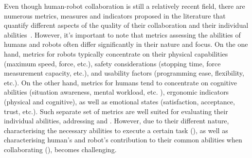 Even though human-robot collaboration is still a relatively recent field, there are numerous metrics, measures and indicators proposed in the literature that quantify different aspects of the quality of their collaboration and their individual abilities~\cite{CORONADO2022collab_quality}.
However, it's important to note that metrics assessing the abilities of humans and robots often differ significantly in their nature and focus. On the one hand, metrics for robots typically concentrate on their physical capabilities (maximum speed, force, etc.), safety considerations (stopping time, force measurement capacity, etc.), and usability factors (programming ease, flexibility, etc.). On the other hand, metrics for humans tend to concentrate on cognitive abilities (situation awareness, mental workload, etc. ), ergonomic indicators (physical and cognitive), as well as emotional states (satisfaction, acceptance, trust, etc.). 
Such separate set of metrics are well suited for evaluating their individual abilities, addressing  and . However, due to their different nature, characterising the necessary abilities to execute a certain task (), as well as characterising human's and robot's contribution to their common abilities when collaborating (), becomes challenging. 




